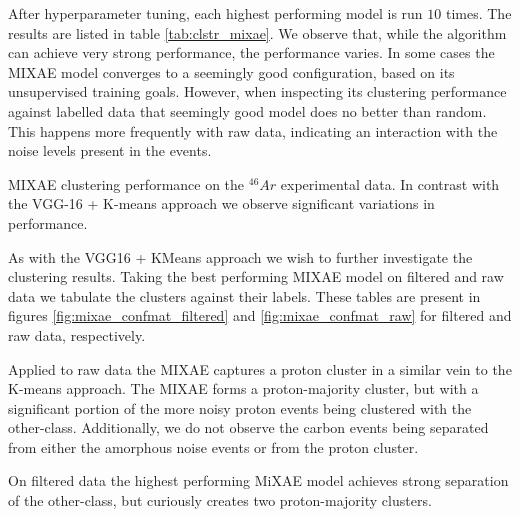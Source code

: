 \documentclass[review,number,sort&compress]{elsarticle}
\begin{document}
After hyperparameter tuning, each highest performing model is run $10$ times. The results are listed in table \ref{tab:clstr_mixae}.
We observe that, while the algorithm can achieve very strong performance, the performance varies. In some cases the MIXAE model converges to a seemingly good configuration, based on its unsupervised training goals. However, when inspecting its clustering performance against labelled data that seemingly good model does no better than random. 
This happens more frequently with raw data, indicating an interaction with the noise levels present in the events. 
 
\begin{table}[H]
\centering 
\caption[MIXAE clustering performance]{MIXAE clustering performance on the ${}^{46} Ar$ experimental data. In contrast with the VGG-16 + K-means approach we observe  significant variations in performance.}\label{tab:clstr_mixae}

\end{table}

As with the VGG16 + KMeans approach we wish to further investigate the clustering results. Taking the best performing MIXAE model on filtered and raw data we tabulate the clusters against their labels. These tables are present in figures \ref{fig:mixae_confmat_filtered} and \ref{fig:mixae_confmat_raw} for filtered and raw data, respectively.

Applied to raw data the MIXAE captures a proton cluster in a similar vein to the K-means approach. The MIXAE forms a proton-majority cluster, but with a significant portion of the more noisy proton events being clustered with the other-class. Additionally, we do not observe the carbon events being separated from either the amorphous noise events or from the proton cluster. 

On filtered data the highest performing MiXAE model achieves strong separation of the other-class, but curiously creates two proton-majority clusters.
 
\end{document}
